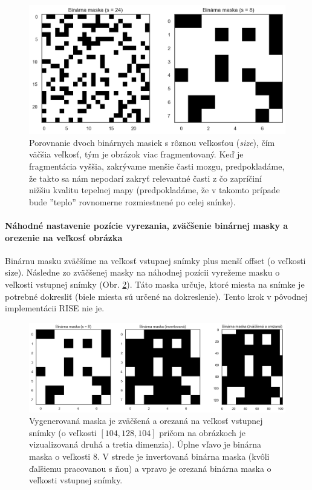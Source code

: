 \begin{figure}[H]
    \centering
    \includegraphics[width=13cm]{assets/images/binary_mask.png}
    \caption{Porovnanie dvoch binárnych masiek s rôznou veľkosťou (\textit{size}), čím väčšia veľkosť, tým je obrázok viac fragmentovaný. Keď je fragmentácia vyššia, zakrývame menšie časti mozgu, predpokladáme, že takto sa nám nepodarí zakryť relevantné časti z čo zapríčiní nižšiu kvalitu tepelnej mapy (predpokladáme, že v takomto prípade bude ''teplo'' rovnomerne rozmiestnené po celej snínke).}
    \label{fig:binary_mask}
\end{figure}

\paragraph{Náhodné nastavenie pozície vyrezania, zväčšenie binárnej masky a orezenie na veľkosť obrázka}

Binárnu masku zväčšíme na veľkosť vstupnej snímky plus menší offset (o veľkosti size). Následne zo zväčšenej masky na náhodnej pozícii vyrežeme masku o veľkosti vstupnej snímky (Obr. \ref{fig:binary_mask_resized}). Táto maska určuje, ktoré miesta na snímke je potrebné dokresliť (biele miesta sú určené na dokreslenie). Tento krok v pôvodnej implementácii RISE nie je.

\begin{figure}[H]
    \centering
    \includegraphics[width=13cm]{assets/images/binary_mask_resized.png}
    \caption{Vygenerovaná maska je zväčšená a orezaná na veľkosť vstupnej snímky (o veľkosti $[104, 128, 104]$ pričom na obrázkoch je vizualizovaná druhá a tretia dimenzia). Úplne vľavo je binárna maska o veľkosti $8$. V strede je invertovaná binárna maska (kvôli ďaľšiemu pracovanou s ňou) a vpravo je orezaná binárna maska o veľkosti vstupnej snímky.}
    \label{fig:binary_mask_resized}
\end{figure}

